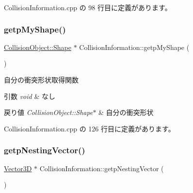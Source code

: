  Collision\+Information.\+cpp の 98 行目に定義があります。

\mbox{\label{class_collision_information_a6776fe9ac5a0421cc96dcf1a7c83d5f2}} 
\subsubsection{\texorpdfstring{getp\+My\+Shape()}{getpMyShape()}}
{\footnotesize\ttfamily \mbox{\hyperlink{class_collision_object_1_1_shape}{Collision\+Object\+::\+Shape}} $\ast$ Collision\+Information\+::getp\+My\+Shape (\begin{DoxyParamCaption}{ }\end{DoxyParamCaption})}



自分の衝突形状取得関数 


\begin{DoxyParams}{引数}
{\em void} & なし \\
\hline
\end{DoxyParams}

\begin{DoxyRetVals}{戻り値}
{\em Collision\+Object\+::\+Shape$\ast$} & 自分の衝突形状 \\
\hline
\end{DoxyRetVals}


 Collision\+Information.\+cpp の 126 行目に定義があります。

\mbox{\label{class_collision_information_abcecc42b221dd5d45abdee5189c90fab}} 
\subsubsection{\texorpdfstring{getp\+Nesting\+Vector()}{getpNestingVector()}}
{\footnotesize\ttfamily \mbox{\hyperlink{class_vector3_d}{Vector3D}} $\ast$ Collision\+Information\+::getp\+Nesting\+Vector (\begin{DoxyParamCaption}{ }\end{DoxyParamCaption})}



